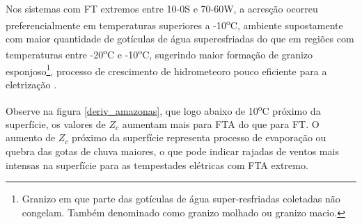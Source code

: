 Nos sistemas com FT extremos entre 10-0S e 70-60W, a acresção ocorreu preferencialmente em temperaturas superiores a -10\textsuperscript{o}C, ambiente supostamente com maior quantidade de gotículas de água superesfriadas do que em regiões com temperaturas entre -20\textsuperscript{o}C e -10\textsuperscript{o}C, sugerindo maior formação de granizo esponjoso\footnote{Granizo em que parte das gotículas de água super-resfriadas coletadas não congelam. Também denominado como granizo molhado ou granizo macio.}, processo de crescimento de hidrometeoro pouco eficiente para a eletrização \cite{jayaratne1983}. 



Observe na figura \ref{deriv_amazonas}, que logo abaixo de 10\textsuperscript{o}C próximo da superfície, os valores de $Z_c$ aumentam mais para FTA do que para FT. O aumento de $Z_c$ próximo da superfície representa processo de evaporação ou quebra das gotas de chuva maiores, o que pode indicar rajadas de ventos mais intensas na superfície para as tempestades elétricas com FTA extremo. 



